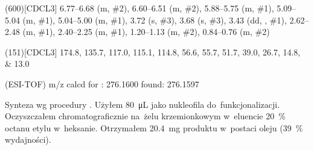 \begin{fullexp}
  \NMR(600)[CDCL3] \numrange{6.77}{6.68} (m, \#{2}), \numrange{6.60}{6.51} (m, \#{2}), \numrange{5.88}{5.75} (m, \#{1}), \numrange{5.09}{5.04} (m, \#{1}), \numrange{5.04}{5.00} (m, \#{1}), \num{3.72} (s, \#{3}), \num{3.68} (s, \#{3}), \num{3.43} (dd, , \#{1}), \numrange{2.62}{2.48} (m, \#{1}), \numrange{2.40}{2.25} (m, \#{1}), \numrange{1.20}{1.13} (m, \#{2}), \numrange{0.84}{0.76} (m, \#{2})\par\noindent
  (151)[CDCL3] \numlist{174.8; 135.7; 117.0; 115.1; 114.8; 56.6; 55.7; 51.7; 39.0; 26.7; 14.8; 13.0}\par\noindent
   (ESI-TOF) m/z calcd for : \num{276.1600} found: \num{276.1597}
\end{fullexp}

Synteza wg procedury .
Użyłem \SI{80}{\uL}  jako nukleofila do~funkcjonalizacji.
Oczyszczałem chromatograficznie na~żelu krzemionkowym w~eluencie \SI{20}{\percent} octanu
  etylu w~heksanie.
Otrzymałem \SI{20.4}{\mg} produktu w~postaci oleju (\SI{39}{\percent} wydajności).

